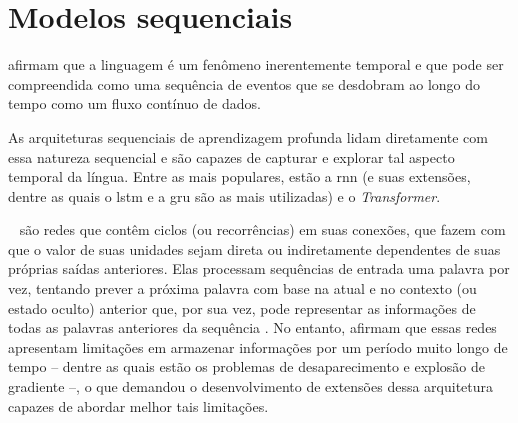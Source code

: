 \section{Modelos sequenciais}
\label{sec:modelos-sequenciais}

 afirmam que a linguagem é um fenômeno inerentemente temporal e que pode ser compreendida como uma sequência de eventos que se desdobram ao longo do tempo como um fluxo contínuo de dados. 

As arquiteturas sequenciais de aprendizagem profunda lidam diretamente com essa natureza sequencial e são capazes de capturar e explorar tal aspecto temporal da língua. 
Entre as mais populares, estão a \acrfull{rnn} (e suas extensões, dentre as quais o \acrfull{lstm} e a \acrfull{gru} são as mais utilizadas) e o \textit{Transformer}. 


~\cite{mikolov-2010-rnn} são redes que contêm ciclos (ou recorrências) em suas conexões, que fazem com que o valor de suas unidades sejam direta ou indiretamente dependentes de suas próprias saídas anteriores. 
Elas processam sequências de entrada uma palavra por vez, tentando prever a próxima palavra com base na atual e no contexto (ou estado oculto) anterior que, por sua vez, pode representar as informações de todas as palavras anteriores da sequência \cite{jurafsky-2022-speech-lang-processing}.
No entanto,  afirmam que essas redes apresentam limitações em armazenar informações por um período muito longo de tempo -- dentre as quais estão os problemas de desaparecimento e explosão de gradiente --, o que demandou o desenvolvimento de extensões dessa arquitetura capazes de abordar melhor tais limitações.


